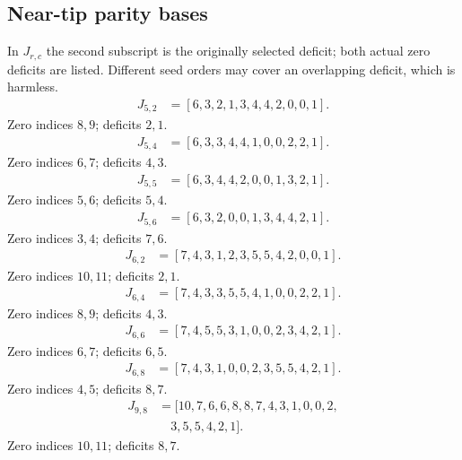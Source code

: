 \documentclass[11pt,a4paper]{article}
\theoremstyle{definition}\newtheorem{definition}[theorem]{Definition}
\theoremstyle{remark}\newtheorem{remark}[theorem]{Remark}
\begin{document}
\subsection{Near-tip parity bases}
In $J_{r,c}$ the second subscript is the originally selected deficit;
both actual zero deficits are listed. Different seed orders may cover an
overlapping deficit, which is harmless.
\[\begin{aligned}
J_{5,2}&=[6,3,2,1,3,4,4,2,0,0,1].
\end{aligned}\]
Zero indices $8,9$; deficits $2,1$.
\[\begin{aligned}
J_{5,4}&=[6,3,3,4,4,1,0,0,2,2,1].
\end{aligned}\]
Zero indices $6,7$; deficits $4,3$.
\[\begin{aligned}
J_{5,5}&=[6,3,4,4,2,0,0,1,3,2,1].
\end{aligned}\]
Zero indices $5,6$; deficits $5,4$.
\[\begin{aligned}
J_{5,6}&=[6,3,2,0,0,1,3,4,4,2,1].
\end{aligned}\]
Zero indices $3,4$; deficits $7,6$.
\[\begin{aligned}
J_{6,2}&=[7,4,3,1,2,3,5,5,4,2,0,0,1].
\end{aligned}\]
Zero indices $10,11$; deficits $2,1$.
\[\begin{aligned}
J_{6,4}&=[7,4,3,3,5,5,4,1,0,0,2,2,1].
\end{aligned}\]
Zero indices $8,9$; deficits $4,3$.
\[\begin{aligned}
J_{6,6}&=[7,4,5,5,3,1,0,0,2,3,4,2,1].
\end{aligned}\]
Zero indices $6,7$; deficits $6,5$.
\[\begin{aligned}
J_{6,8}&=[7,4,3,1,0,0,2,3,5,5,4,2,1].
\end{aligned}\]
Zero indices $4,5$; deficits $8,7$.
\[\begin{aligned}
J_{9,8}&=[10,7,6,6,8,8,7,4,3,1,0,0,2,\\
&\quad 3,5,5,4,2,1].
\end{aligned}\]
Zero indices $10,11$; deficits $8,7$.
\end{document}
